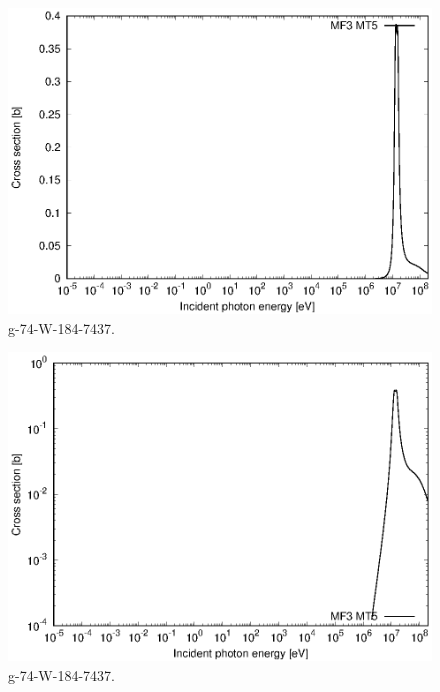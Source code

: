 \begin{figure}
 \includegraphics[width=\linewidth]{eps/g_74-W-184_7437.eps}
  \caption{g-74-W-184-7437.}
\end{figure}
\begin{figure}
 \includegraphics[width=\linewidth]{eps-log/g_74-W-184_7437.eps}
 \caption{g-74-W-184-7437.}
\end{figure}
\newpage \clearpage


